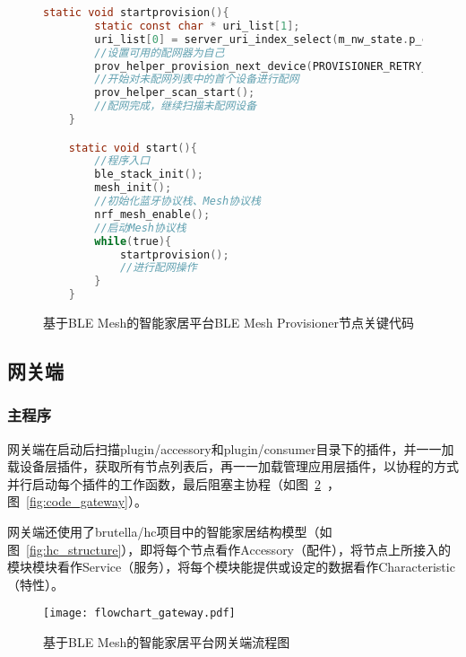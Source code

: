 \begin{figure}[H]
    \centering
    \begin{lstlisting}[language=C]
    static void startprovision(){
        static const char * uri_list[1];
        uri_list[0] = server_uri_index_select(m_nw_state.p_client_uri);
        //设置可用的配网器为自己
        prov_helper_provision_next_device(PROVISIONER_RETRY_COUNT, m_nw_state.next_device_address, uri_list, ARRAY_SIZE(uri_list));
        //开始对未配网列表中的首个设备进行配网
        prov_helper_scan_start();
        //配网完成，继续扫描未配网设备
    }

    static void start(){
        //程序入口
        ble_stack_init();
        mesh_init();
        //初始化蓝牙协议栈、Mesh协议栈
        nrf_mesh_enable();
        //启动Mesh协议栈
        while(true){
            startprovision();
            //进行配网操作
        }
    }
    \end{lstlisting}
    \caption{基于BLE Mesh的智能家居平台BLE Mesh Provisioner节点关键代码}
    \label{fig:code_mesh_provisioner}
\end{figure}

\subsection{网关端}
\subsubsection{主程序}
网关端在启动后扫描plugin/accessory和plugin/consumer目录下的插件，并一一加载设备层插件，获取所有节点列表后，再一一加载管理应用层插件，以协程的方式并行启动每个插件的工作函数，最后阻塞主协程（如图~\ref{fig:flowchart_gateway}~，图~\ref{fig:code_gateway}）。

网关端还使用了brutella/hc项目中的智能家居结构模型（如图~\ref{fig:hc_structure}），即将每个节点看作Accessory（配件），将节点上所接入的模块模块看作Service（服务），将每个模块能提供或设定的数据看作Characteristic（特性）。

\begin{figure}[H]
    \centering
    \texttt{[image: flowchart\_gateway.pdf]}
    \caption{基于BLE Mesh的智能家居平台网关端流程图}
    \label{fig:flowchart_gateway}
\end{figure}

